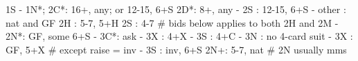 1S - 1N*; 2C*: 16+, any; or 12-15, 6+S
2D*: 8+, any
   - 2S : 12-15, 6+S
   - other : nat and GF
2H : 5-7, 5+H
2S : 4-7
# bids below applies to both 2H and 2M
   - 2N*: GF, some 6+S
        - 3C*: ask
             - 3X : 4+X
             - 3S : 4+C
             - 3N : no 4-card suit
   - 3X : GF, 5+X  # except raise = inv
   - 3S : inv, 6+S
2N+: 5-7, nat  # 2N usually mms